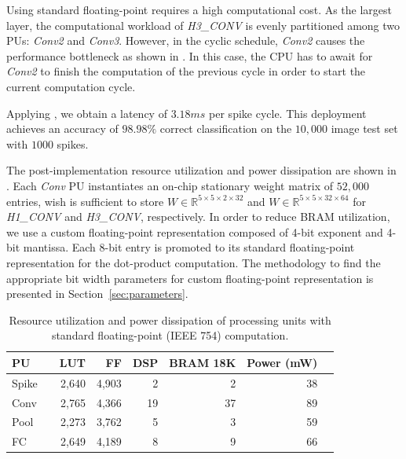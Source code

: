 Using standard floating-point requires a high computational cost. As the largest layer, the computational workload of \emph{H3\_CONV} is evenly partitioned among two PUs: \emph{Conv2} and \emph{Conv3}. However, in the cyclic schedule, \emph{Conv2} causes the performance bottleneck as shown in . In this case, the CPU has to await for \emph{Conv2} to finish the computation of the previous cycle in order to start the current computation cycle.

Applying , we obtain a latency of $3.18 ms$ per spike cycle. This deployment achieves an accuracy of $98.98\%$ correct classification on the $10,000$ image test set with $1000$ spikes.

The post-implementation resource utilization and power dissipation are shown in .
Each \emph{Conv} PU instantiates an on-chip stationary weight matrix of $52,000$ entries, wish is sufficient to store $W\in\mathbb{R}^{5\times 5\times 2\times 32}$ and $W\in\mathbb{R}^{5\times 5\times 32\times 64}$ for \emph{H1\_CONV} and \emph{H3\_CONV}, respectively. In order to reduce BRAM utilization, we use a custom floating-point representation composed of 4-bit exponent and 4-bit mantissa. Each 8-bit entry is promoted to its standard floating-point representation for the dot-product computation. The methodology to find the appropriate bit width parameters for custom floating-point representation is presented in Section~\ref{sec:parameters}.

\begin{table}[!h]\centering
	\caption{Resource utilization and power dissipation of processing units with standard floating-point (IEEE 754) computation.}\label{tab:resource_fp}
	\scriptsize
	\begin{tabular}{lrrrrrrr}\toprule
		\textbf{PU} & &\textbf{LUT} &\textbf{FF} &\textbf{DSP} &\textbf{BRAM 18K} &\textbf{Power (mW)} \\\midrule
		Spike & &2,640 &4,903 &2 &2 &38 \\
		Conv & &2,765 &4,366 &19 &37 &89 \\
		Pool & &2,273 &3,762 &5 &3 &59 \\
		FC & &2,649 &4,189 &8 &9 &66 \\
		\bottomrule
	\end{tabular}
\end{table}

